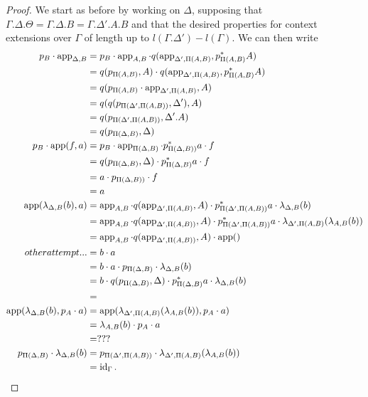 \documentclass[a4paper,fontsize=12pt]{scrartcl}
\begin{document}
\begin{proof}
  We start as before by working on $\Delta$, supposing that
  $\Gamma.\Delta.\Theta=\Gamma.\Delta.B=\Gamma.\Delta'.A.B$ and that
  the desired properties for context extensions over $\Gamma$ of length
  up to $l(\Gamma.\Delta')-l(\Gamma)$.
  We can then write
  \begin{align*}
    p_B\cdot\operatorname{app}_{\Delta,B}
    &=p_B\cdot
    \operatorname{app}_{A,B}\cdot
    q(\operatorname{app}_{\Delta',\Pi(A,B)},p^*_{\Pi(A,B)}A) \\
    &=q(p_{\Pi(A,B)},A)\cdot
    q(\operatorname{app}_{\Delta',\Pi(A,B)},p^*_{\Pi(A,B)}A) \\
    &=q(p_{\Pi(A,B)}\cdot\operatorname{app}_{\Delta',\Pi(A,B)},A) \\
    &=q(q(p_{\Pi(\Delta',\Pi(A,B))},\Delta'),A) \\
    &=q(p_{\Pi(\Delta',\Pi(A,B))},\Delta'.A) \\
    &=q(p_{\Pi(\Delta,B)},\Delta) \\
    p_B\cdot\operatorname{app}(f,a)
    &=p_B\cdot
    \operatorname{app}_{\Pi(\Delta,B)}\cdot
    p^*_{\Pi(\Delta,B))}a\cdot
    f \\
    &=q(p_{\Pi(\Delta,B)},\Delta)\cdot
    p^*_{\Pi(\Delta,B)}a\cdot
    f \\
    &=a\cdot
    p_{\Pi(\Delta,B))}\cdot
    f \\
    &=a \\
    \operatorname{app}(\lambda_{\Delta,B}(b),a)
    &=\operatorname{app}_{A,B}\cdot
    q(\operatorname{app}_{\Delta',\Pi(A,B)},A)\cdot
    p^*_{\Pi(\Delta',\Pi(A,B))}a\cdot
    \lambda_{\Delta,B}(b) \\
    &=\operatorname{app}_{A,B}\cdot
    q(\operatorname{app}_{\Delta',\Pi(A,B))},A)\cdot
    p^*_{\Pi(\Delta',\Pi(A,B))}a\cdot
    \lambda_{\Delta',\Pi(A,B)}(\lambda_{A,B}(b)) \\
    &=\operatorname{app}_{A,B}\cdot
    q(\operatorname{app}_{\Delta',\Pi(A,B))},A)\cdot
    \operatorname{app}() \\
    other attempt...
    &=b\cdot a \\
    &=b\cdot
    a\cdot
    p_{\Pi(\Delta,B)}\cdot
    \lambda_{\Delta,B}(b) \\
    &=b\cdot
    q(p_{\Pi(\Delta,B)},\Delta)\cdot
    p^*_{\Pi(\Delta,B)}a\cdot
    \lambda_{\Delta,B}(b) \\
    &= \\
    \operatorname{app}(\lambda_{\Delta,B}(b),p_A\cdot a)
    &=\operatorname{app}(\lambda_{\Delta',\Pi(A,B)}(\lambda_{A,B}(b)),p_A\cdot a) \\
    &=\lambda_{A,B}(b)\cdot p_A\cdot a \\
    &= ??? \\
    p_{\Pi(\Delta,B)}\cdot\lambda_{\Delta,B}(b)
    &=p_{\Pi(\Delta',\Pi(A,B))}\cdot
    \lambda_{\Delta',\Pi(A,B)}(\lambda_{A,B}(b)) \\
    &=\operatorname{id}_\Gamma.
  \end{align*}


\end{proof}
\end{document}

